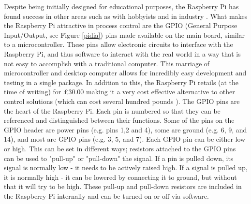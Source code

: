 \documentclass[a4]{report}
\begin{document}
	Despite being initially designed for educational purposes, the Raspberry Pi has found success in other areas such as with hobbyists \cite{pihobbynotedu} and in industry \cite{pimorethanedu}. What makes the Raspberry Pi attractive in process control are the GPIO (General Purpose Input/Output, see Figure \ref{pidia}) pins made available on the main board, similar to a microcontroller. These pins allow electronic circuits to interface with the Raspberry Pi, and thus software to interact with the real world in a way that is not easy to accomplish with a traditional computer. This marriage of microcontroller and desktop computer allows for incredibly easy development and testing in a single package. In addition to this, the Raspberry Pi retails (at the time of writing) for \pounds 30.00 \cite{picost} making it a very cost effective alternative to other control solutions (which can cost several hundred pounds \cite{otherpcucost}). \newline \newline \noindent
	The GPIO pins are the heart of the Raspberry Pi. Each pin is numbered so that they can be referenced and distinguished between their functions. Some of the pins on the GPIO header are power pins (e.g.  pins 1,2 and 4), some are ground (e.g. 6, 9, and 14), and most are GPIO pins (e.g. 3, 5, and 7). Each GPIO pin can be either low or high. This can be set in different ways; resistors attached to the GPIO pins can be used to "pull-up" or "pull-down" the signal. If a pin is pulled down, its signal is normally low - it needs to be actively raised high. If a signal is pulled up, it is normally high - it can be lowered by connecting it to ground, but without that it will try to be high. These pull-up and pull-down resistors are included in the Raspberry Pi internally and can be turned on or off via software. \newline
\end{document}
